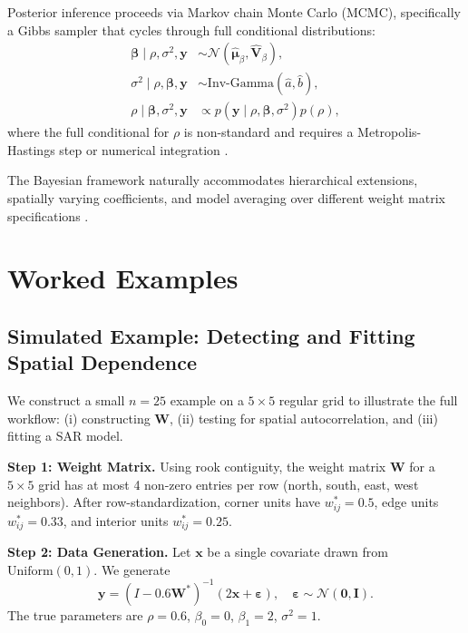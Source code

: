 \documentclass[conference]{IEEEtran}
\theoremstyle{definition}
\begin{document}
Posterior inference proceeds via Markov chain Monte Carlo (MCMC), specifically a Gibbs sampler that cycles through full conditional distributions:
\begin{align}
\bm{\beta} \mid \rho, \sigma^2, \mathbf{y} &\sim \mathcal{N}(\hat{\bm{\mu}}_\beta, \hat{\mathbf{V}}_\beta), \\
\sigma^2 \mid \rho, \bm{\beta}, \mathbf{y} &\sim \text{Inv-Gamma}(\hat{a}, \hat{b}), \\
\rho \mid \bm{\beta}, \sigma^2, \mathbf{y} &\propto p(\mathbf{y} \mid \rho, \bm{\beta}, \sigma^2) p(\rho),
\end{align}
where the full conditional for $\rho$ is non-standard and requires a Metropolis-Hastings step or numerical integration \cite{lacombe2004bayesian}.

The Bayesian framework naturally accommodates hierarchical extensions, spatially varying coefficients, and model averaging over different weight matrix specifications \cite{lesage2009introduction}.

\section{Worked Examples}
\label{sec:examples}

\subsection{Simulated Example: Detecting and Fitting Spatial Dependence}

We construct a small $n = 25$ example on a $5 \times 5$ regular grid to illustrate the full workflow: (i) constructing $\mathbf{W}$, (ii) testing for spatial autocorrelation, and (iii) fitting a SAR model.

\textbf{Step 1: Weight Matrix.} Using rook contiguity, the weight matrix $\mathbf{W}$ for a $5\times 5$ grid has at most 4 non-zero entries per row (north, south, east, west neighbors). After row-standardization, corner units have $w_{ij}^* = 0.5$, edge units $w_{ij}^* = 0.33$, and interior units $w_{ij}^* = 0.25$.

\textbf{Step 2: Data Generation.} Let $\mathbf{x}$ be a single covariate drawn from $\text{Uniform}(0,1)$. We generate
\begin{equation}
\mathbf{y} = (I - 0.6\mathbf{W}^*)^{-1}(2\mathbf{x} + \bm{\varepsilon}), \quad \bm{\varepsilon} \sim \mathcal{N}(\mathbf{0}, \mathbf{I}).
\end{equation}
The true parameters are $\rho = 0.6$, $\beta_0 = 0$, $\beta_1 = 2$, $\sigma^2 = 1$.
\end{document}

